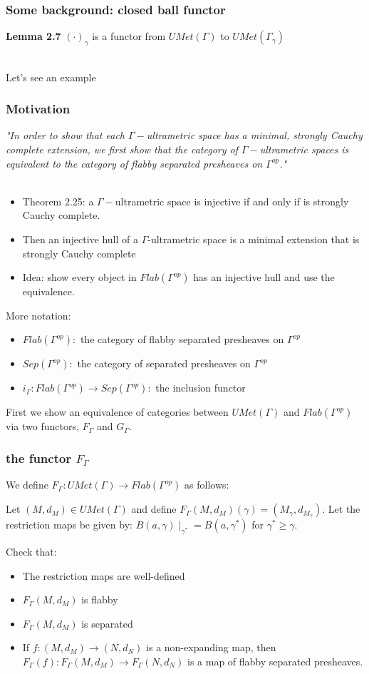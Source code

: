 \documentclass{beamer}
\begin{document}
\begin{frame}
	\frametitle{Some background: closed ball functor}
\textbf{Lemma 2.7} $(\cdot)_\gamma$ is a functor from $UMet(\Gamma)$ to $UMet(\Gamma_\gamma)$\\~\

Let's see an example
\end{frame}

\begin{frame}
\frametitle{Motivation}
\textit{"In order to show that each $\Gamma-$ultrametric space has a minimal, strongly Cauchy complete extension, we first show that the category of $\Gamma-$ultrametric spaces is equivalent to the category of flabby separated presheaves on $\Gamma^{op}$."}\\~\
\begin{itemize}
	\item Theorem 2.25: a $\Gamma-$ultrametric space is injective if and only if is strongly Cauchy complete.
	\item Then an injective hull of a $\Gamma$-ultrametric space is a minimal extension that is strongly Cauchy complete
	\item Idea: show every object in $Flab(\Gamma^{op})$ has an injective hull and use the equivalence.
\end{itemize}
\end{frame}

\begin{frame}
More notation:
\begin{itemize}
	\item $Flab(\Gamma^{op}):$ the category of flabby separated presheaves on $\Gamma^{op}$
	\item $Sep(\Gamma^{op}):$ the category of separated presheaves on $\Gamma^{op}$
	\item $i_\Gamma: Flab(\Gamma^{op}) \rightarrow Sep(\Gamma^{op}):$ the inclusion functor
\end{itemize}
\[\]
First we show an equivalence of categories between $UMet(\Gamma)$ and $Flab(\Gamma^{op})$ via two functors, $F_\Gamma$ and $G_\Gamma$.
\end{frame}	


\begin{frame}
\frametitle{the functor $F_\Gamma$}
We define $F_\Gamma: UMet(\Gamma) \rightarrow Flab(\Gamma^{op})$ as follows:
\begin{definition}
Let $(M,d_M) \in UMet(\Gamma)$ and define $F_\Gamma(M, d_M)(\gamma) = (M_\gamma,d_{M_\gamma})$. Let the restriction maps be given by: $B(a,\gamma)\mid_{\gamma^*}=B(a,\gamma^*)$ for $\gamma^* \geq \gamma$.
\end{definition}
Check that:
\begin{itemize}
	\item The restriction maps are well-defined
	\item $ F_\Gamma(M,d_M)$ is flabby
	\item $ F_\Gamma(M,d_M)$ is separated
	\item If $f:(M,d_M) \rightarrow (N,d_N)$ is a non-expanding map, then $F_\Gamma(f):F_\Gamma(M,d_M) \rightarrow F_\Gamma(N,d_N)$ is a map of flabby separated presheaves. 
\end{itemize}
\end{frame}
\end{document}
